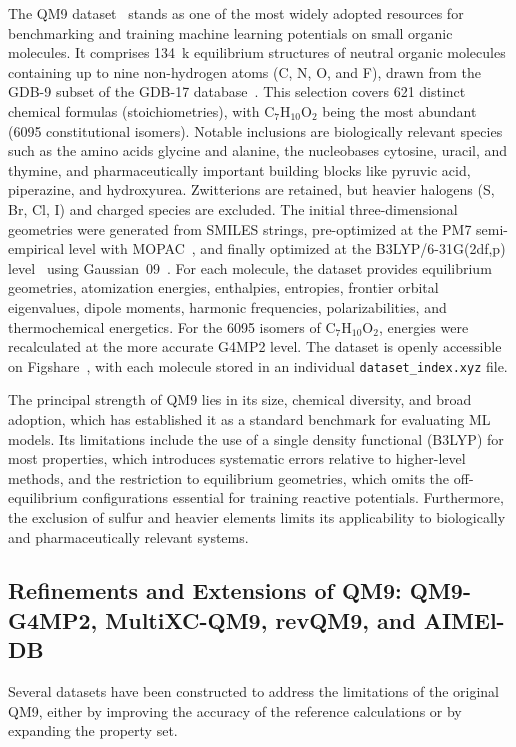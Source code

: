 \documentclass[12pt]{article}
\begin{document}
The QM9 dataset~\cite{ds1-1} stands as one of the most widely adopted resources for benchmarking and training machine learning potentials on small organic molecules. It comprises 134~k equilibrium structures of neutral organic molecules containing up to nine non-hydrogen atoms (C, N, O, and F), drawn from the GDB-9 subset of the GDB-17 database~\cite{ds1-52}. This selection covers 621 distinct chemical formulas (stoichiometries), with C$_7$H$_{10}$O$_2$ being the most abundant (6095 constitutional isomers). Notable inclusions are biologically relevant species such as the amino acids glycine and alanine, the nucleobases cytosine, uracil, and thymine, and pharmaceutically important building blocks like pyruvic acid, piperazine, and hydroxyurea. Zwitterions are retained, but heavier halogens (S, Br, Cl, I) and charged species are excluded. The initial three-dimensional geometries were generated from SMILES strings, pre-optimized at the PM7 semi-empirical level with MOPAC~\cite{ds1-53}, and finally optimized at the B3LYP/6-31G(2df,p) level~\cite{ds1-54,ds1-55,ds1-56,ds1-57} using Gaussian~09~\cite{ds1-58}. For each molecule, the dataset provides equilibrium geometries, atomization energies, enthalpies, entropies, frontier orbital eigenvalues, dipole moments, harmonic frequencies, polarizabilities, and thermochemical energetics. For the 6095 isomers of C$_7$H$_{10}$O$_2$, energies were recalculated at the more accurate G4MP2 level. The dataset is openly accessible on Figshare~\cite{ds1-1}, with each molecule stored in an individual \texttt{dataset\_index.xyz} file.

The principal strength of QM9 lies in its size, chemical diversity, and broad adoption, which has established it as a standard benchmark for evaluating ML models. Its limitations include the use of a single density functional (B3LYP) for most properties, which introduces systematic errors relative to higher-level methods, and the restriction to equilibrium geometries, which omits the off-equilibrium configurations essential for training reactive potentials. Furthermore, the exclusion of sulfur and heavier elements limits its applicability to biologically and pharmaceutically relevant systems.

\subsection{Refinements and Extensions of QM9: QM9-G4MP2, MultiXC-QM9, revQM9, and AIMEl-DB}

Several datasets have been constructed to address the limitations of the original QM9, either by improving the accuracy of the reference calculations or by expanding the property set.
\end{document}
